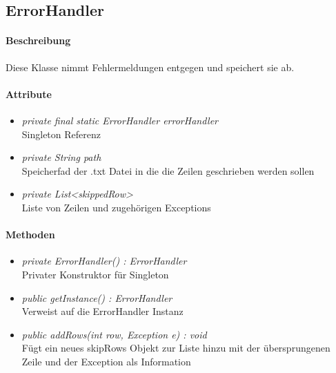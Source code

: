 \subsection{ErrorHandler}

\paragraph{Beschreibung}
Diese Klasse nimmt Fehlermeldungen entgegen und speichert sie ab.

\paragraph{Attribute}
\begin{itemize}
\item \textit{private final static ErrorHandler errorHandler}
\\ Singleton Referenz
\item \textit{private String path}
\\ Speicherfad der .txt Datei in die die Zeilen geschrieben werden sollen
\item \textit{private List<skippedRow>}
\\ Liste von Zeilen und zugehörigen Exceptions
\end{itemize}

\paragraph{Methoden}

\begin{itemize}
\item \textit{private ErrorHandler() : ErrorHandler}  \\Privater Konstruktor für Singleton
\item \textit{public getInstance() : ErrorHandler} \\Verweist auf die ErrorHandler Instanz
\item \textit{public addRows(int row, Exception e) : void}
\\Fügt ein neues skipRows Objekt zur Liste hinzu mit der übersprungenen Zeile und der Exception als Information 

\end{itemize}